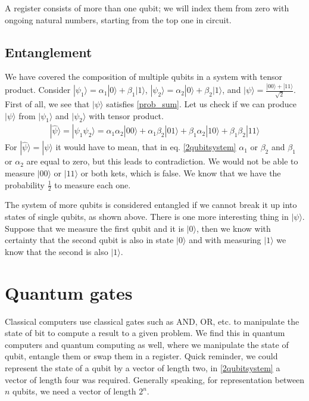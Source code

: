  A register consists of more than one qubit; we will index them from zero with ongoing natural numbers, starting from the top one in circuit.

\subsection{Entanglement}
We have covered the composition of multiple qubits in a system with tensor product. Consider $|\psi_1\rangle = \alpha_1 |0\rangle +\beta_1 |1\rangle$, $ |\psi_2\rangle = \alpha_2 |0\rangle +\beta_2 |1\rangle$, and $|\psi \rangle = \frac{|00 \rangle + |11 \rangle }{\sqrt{2}} $. First of all, we see that $| \psi \rangle$ satisfies \ref{prob_sum}. Let us check if we can produce $| \psi \rangle$ from $| \psi_1 \rangle$ and $| \psi_2 \rangle$ with tensor product.
\begin{equation} \label{2qubitsystem}
  \begin{aligned}
    |\widehat{\psi}\rangle = |\psi_1 \psi_2 \rangle = 
    \alpha_1 \alpha_2 |00\rangle +
    \alpha_1 \beta_2 |01\rangle +
    \beta_1 \alpha_2 |10\rangle +
    \beta_1 \beta_2 |11\rangle
    \end{aligned}
\end{equation}
For $|\widehat{\psi}\rangle = |\psi\rangle$ it would have to mean, that in eq. \ref{2qubitsystem} $\alpha_1$ or $\beta_2$ and $\beta_1$ or $\alpha_2$ are equal to zero, but this leads to contradiction. We would not be able to measure $|00\rangle$ or $|11\rangle$ or both kets, which is false. We know that we have the probability $\frac{1}{2}$ to measure each one. 

The system of more qubits is considered entangled if we cannot break it up into states of single qubits, as shown above. There is one more interesting thing in $| \psi \rangle$. Suppose that we measure the first qubit and it is $|0\rangle$, then we know with certainty that the second qubit is also in state $|0\rangle$ and with measuring $|1\rangle$ we know that the second is also $|1\rangle$. 

\section{Quantum gates}

Classical computers use classical gates such as AND, OR, etc. to manipulate the state of bit to compute a result to a given problem. We find this in quantum computers and quantum computing as well, where we manipulate the state of qubit, entangle them or swap them in a register. 
Quick reminder, we could represent the state of a qubit by a vector of length two, in \ref{2qubitsystem} a vector of length four was required. Generally speaking, for representation between $n$ qubits, we need a vector of length $2^n$.

